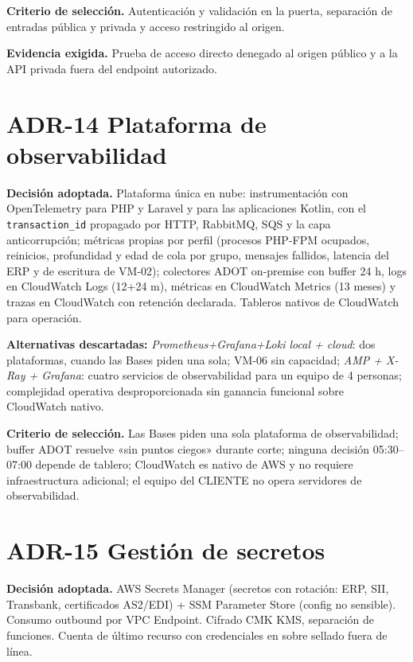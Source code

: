 \textbf{Criterio de selección.} Autenticación y validación en la puerta, separación de entradas pública y privada y acceso restringido al origen.

\textbf{Evidencia exigida.} Prueba de acceso directo denegado al origen público y a la API privada fuera del endpoint autorizado.

\section{ADR-14 \textperiodcentered{} Plataforma de observabilidad}
\label{sub:adr-14}

\textbf{Decisión adoptada.} Plataforma única en nube: instrumentación con OpenTelemetry para PHP y Laravel y para las aplicaciones Kotlin, con el \texttt{transaction\_id} propagado por HTTP, RabbitMQ, SQS y la capa anticorrupción; métricas propias por perfil (procesos PHP-FPM ocupados, reinicios, profundidad y edad de cola por grupo, mensajes fallidos, latencia del ERP y de escritura de VM-02); colectores ADOT on-premise con buffer 24 h, logs en CloudWatch Logs (12+24 m), métricas en CloudWatch Metrics (13 meses) y trazas en CloudWatch con retención declarada. Tableros nativos de CloudWatch para operación.

\textbf{Alternativas descartadas:} \emph{Prometheus+Grafana+Loki local + cloud}: dos plataformas, cuando las Bases piden una sola; VM-06 sin capacidad; \emph{AMP + X-Ray + Grafana}: cuatro servicios de observabilidad para un equipo de 4 personas; complejidad operativa desproporcionada sin ganancia funcional sobre CloudWatch nativo.

\textbf{Criterio de selección.} Las Bases piden una sola plataforma de observabilidad; buffer ADOT resuelve «sin puntos ciegos» durante corte; ninguna decisión 05:30--07:00 depende de tablero; CloudWatch es nativo de AWS y no requiere infraestructura adicional; el equipo del CLIENTE no opera servidores de observabilidad.

\section{ADR-15 \textperiodcentered{} Gestión de secretos}
\label{sub:adr-15}

\textbf{Decisión adoptada.} AWS Secrets Manager (secretos con rotación: ERP, SII, Transbank, certificados AS2/EDI) + SSM Parameter Store (config no sensible). Consumo outbound por VPC Endpoint. Cifrado CMK KMS, separación de funciones. Cuenta de último recurso con credenciales en sobre sellado fuera de línea.

